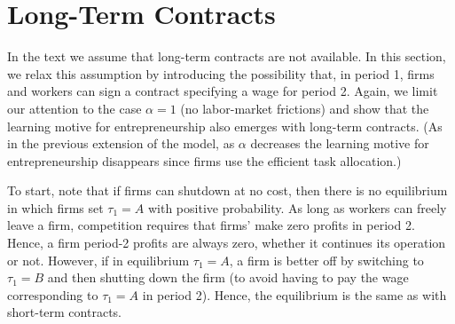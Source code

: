 \documentclass[12pt,american]{paper}
\theoremstyle{remark}
\newtheorem{cor}{Corollary}
\begin{document}
    


\section{Long-Term Contracts}\label{app:long term}


In the text we assume that long-term contracts are not available. In this section, we relax this assumption by introducing the possibility that, in period 1, firms and workers can sign a contract specifying a wage for period 2. Again, we limit our attention to the case $\alpha=1$ (no labor-market frictions) and show that the learning motive for entrepreneurship also emerges with long-term contracts. (As in the previous extension of the model, as $\alpha$ decreases the learning motive for entrepreneurship disappears since firms use the efficient task allocation.)

To start, note that if firms can shutdown at no cost, then there is no equilibrium in which firms set $\tau_1=A$ with positive probability. As long as workers can freely leave a firm, competition requires that firms' make zero profits in period 2. Hence, a firm period-2 profits are always zero, whether it continues its operation or not. However, if in equilibrium $\tau_1=A$, a firm is better off by switching to $\tau_1=B$ and then shutting down the firm (to avoid having to pay the wage corresponding to $\tau_1=A$ in period 2). Hence, the equilibrium is the same as with short-term contracts.


\end{document}
